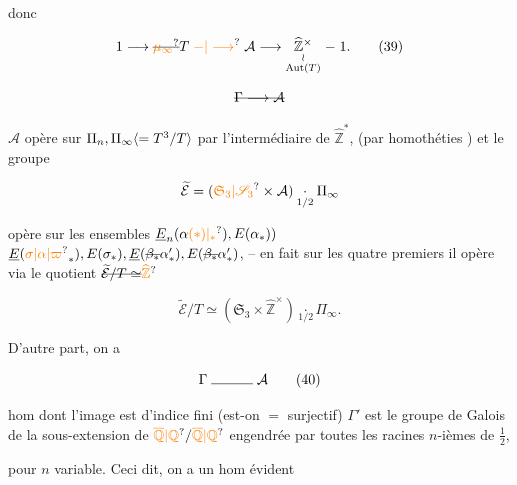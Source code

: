 donc

\[
1\longrightarrow\deleted{\unsure{\mu_\infty}}T\mathrel{\unsure{-|\longrightarrow}}\mathcal A\longrightarrow
\underset{\substack{\wr\\\operatorname{Aut}(T)}}{\widehat{\mathbb Z}^{\times}}\mathrel{-}1.
\tag*{(39)}
\]


\[
\deleted{\Gamma\longrightarrow\mathcal A}
\]

$\mathcal A$ opère sur $\Pi_n,\Pi_\infty\inserted{=T^3/T}$ par l'intermédiaire de $\widehat{\mathbb Z}^{*}$, (par homothéties  ) et le groupe

\[
\widetilde{\mathcal E}=(\unsure{\mathfrak S_3|\mathscr S_3}\times\mathcal A)\underset{1/2}{\cdot}\Pi_\infty
\]


opère  sur les ensembles $\underline E_n(\alpha\unsure{(*)|{}_*}),E(\alpha_*))$ $\underline E(\unsure{\sigma|\alpha|\varpi}_*),E(\sigma_*),\underline E(\deleted{\beta_*}\alpha'_*),E(\deleted{\beta_*}\alpha'_*)$, -- en fait sur les quatre premiers il opère via le quotient $\deleted{\widetilde{\mathcal E}/T\simeq}\unsure{\widehat{\mathbb Z}}$

\[
\widetilde{\mathcal E}/T\simeq(\mathfrak S_3\times\widehat{\mathbb Z}^{\times})\underset{1/2}{\cdot}\Pi_\infty .
\]

D'autre part, on a

\[
\Gamma\mathrel{\rule{3em}{0.4pt}}\mathcal A
\tag*{(40)}
\]

hom dont l'image  est d'indice fini (est-on $=$ surjectif) $\Gamma'$ est le groupe de Galois de la sous-extension de $\unsure{\overline{\mathbb Q}|\mathbb Q}/\unsure{\overline{\mathbb Q}|\mathbb Q}$ engendrée par toutes les racines $n$-ièmes de $\tfrac12$,



pour $n$ variable. Ceci dit, on a un hom évident

